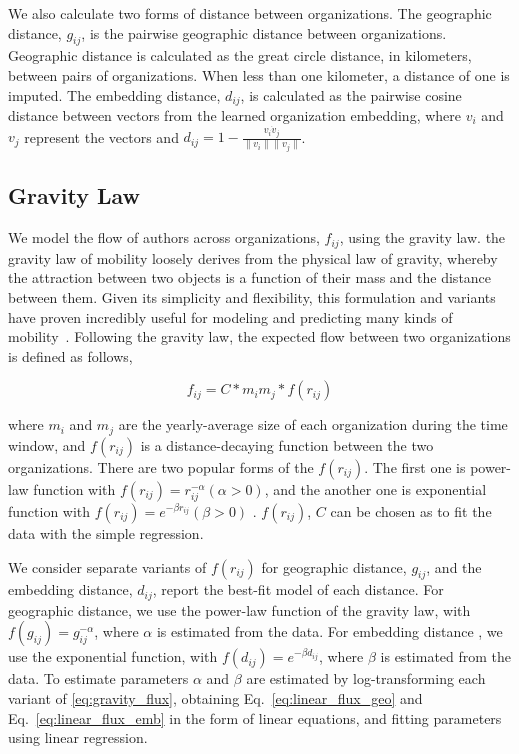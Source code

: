 \documentclass[12pt]{article} %
\begin{document}
We also calculate two forms of distance between organizations. 
The geographic distance, $g_{ij}$, is the pairwise geographic distance between organizations.
Geographic distance is calculated as the great circle distance, in kilometers, between pairs of organizations. 
When less than one kilometer, a distance of one is imputed. 
The embedding distance, $d_{ij}$, is calculated as the pairwise cosine distance between vectors from the learned organization embedding, where $v_{i}$ and $v_{j}$ represent the vectors and $d_{ij} = 1 - \frac{v_{i} \dot v_{j}}{\lVert v_{i} \rVert \lVert v_{j} \rVert}$.

%
%
\subsection{Gravity Law}

We model the flow of authors across organizations, $f_{ij}$, using the gravity law. 
the gravity law of mobility loosely derives from the physical law of gravity, whereby the attraction between two objects is a function of their mass and the distance between them.
Given its simplicity and flexibility, this formulation and variants have proven incredibly useful for modeling and predicting many kinds of mobility~\cite{jung2008highwaygravity, curiel2018citygravity, lewer2008immigrationgravity, xia2005measlesgravity, truscott2012epidemicgravity, hong2016busgravity}.
Following the gravity law, the expected flow between two organizations is defined as follows,

\begin{equation}
	\label{eq:gravity_basic}
	f_{ij} = C*m_{i}m_{j}*f(r_{ij})
\end{equation}

where $m_{i}$ and $m_{j}$ are the yearly-average size of each organization during the time window, and $f(r_{ij})$ is a distance-decaying function  between the two organizations. There are two popular forms of the $f(r_{ij})$. The first one is power-law function with $f(r_{ij})= r^{-\alpha}_{ij}  (\alpha > 0)$, and the another one is exponential function with $f(r_{ij}) = e^{-\beta r_{ij}} (\beta > 0)$ \cite{chen2015distance}.  $f(r_{ij})$, $C$ can be chosen as to fit the data with the simple regression.

We consider separate variants of $f(r_{ij})$ for geographic distance, $g_{ij}$, and the embedding distance, $d_{ij}$, report the best-fit model of each distance.
For geographic distance, we use the power-law function of the gravity law, with $f(g_{ij})= g^{-\alpha}_{ij}$, where $\alpha$ is estimated from the data. 
For embedding distance , we use the exponential function, with $f(d_{ij}) = e^{-\beta d_{ij}}$, where $\beta$ is estimated from the data. 
To estimate parameters $\alpha$ and $\beta$ are estimated by log-transforming each variant of \ref{eq:gravity_flux}, obtaining Eq.~\ref{eq:linear_flux_geo} and Eq.~\ref{eq:linear_flux_emb} in the form of linear equations, and fitting parameters using linear regression. 
\end{document}
